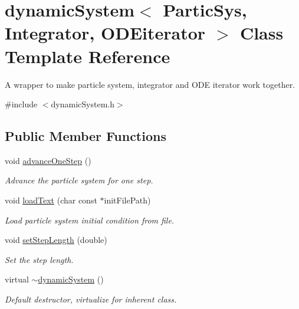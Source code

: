 \hypertarget{classdynamic_system}{}\section{dynamic\+System$<$ Partic\+Sys, Integrator, O\+D\+Eiterator $>$ Class Template Reference}
\label{classdynamic_system}


A wrapper to make particle system, integrator and O\+DE iterator work together.  




{\ttfamily \#include $<$dynamic\+System.\+h$>$}

\subsection*{Public Member Functions}
\begin{DoxyCompactItemize}
\item 
void \mbox{\hyperlink{classdynamic_system_a3b6569e359c6451a038107455903c6a1}{advance\+One\+Step}} ()
\begin{DoxyCompactList}\small\item\em Advance the particle system for one step. \end{DoxyCompactList}\item 
void \mbox{\hyperlink{classdynamic_system_a44849a58489dd8c300edc920f793c56a}{load\+Text}} (char const $\ast$init\+File\+Path)
\begin{DoxyCompactList}\small\item\em Load particle system initial condition from file. \end{DoxyCompactList}\item 
void \mbox{\hyperlink{classdynamic_system_af1b1ccfa965c677bd66029b42377117d}{set\+Step\+Length}} (double)
\begin{DoxyCompactList}\small\item\em Set the step length. \end{DoxyCompactList}\item 
virtual \mbox{\hyperlink{classdynamic_system_a5818e6ffd72fcbfcac01738f5cb8d7a3}{$\sim$dynamic\+System}} ()
\begin{DoxyCompactList}\small\item\em Default destructor, virtualize for inherent class. \end{DoxyCompactList}\end{DoxyCompactItemize}
